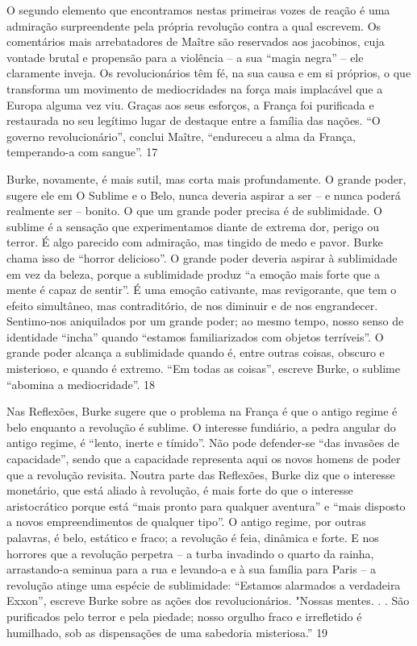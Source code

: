 \par
 
O segundo elemento que encontramos nestas primeiras vozes de reação é uma admiração surpreendente pela própria revolução contra a qual escrevem. Os comentários mais arrebatadores de Maître são reservados aos jacobinos, cuja vontade brutal e propensão para a violência – a sua “magia negra” – ele claramente inveja. Os revolucionários têm fé, na sua causa e em si próprios, o que transforma um movimento de mediocridades na força mais implacável que a Europa alguma vez viu. Graças aos seus esforços, a França foi purificada e restaurada no seu legítimo lugar de destaque entre a família das nações. “O governo revolucionário”, conclui Maître, “endureceu a alma da França, temperando-a com sangue”.
 {\color{blue} 17}  

 
\par
 
Burke, novamente, é mais sutil, mas corta mais profundamente. O grande poder, sugere ele em O Sublime e o Belo, nunca deveria aspirar a ser – e nunca poderá realmente ser – bonito. O que um grande poder precisa é de sublimidade. O sublime é a sensação que experimentamos diante de extrema dor, perigo ou terror. É algo parecido com admiração, mas tingido de medo e pavor. Burke chama isso de “horror delicioso”. O grande poder deveria aspirar à sublimidade em vez da beleza, porque a sublimidade produz “a emoção mais forte que a mente é capaz de sentir”. É uma emoção cativante, mas revigorante, que tem o efeito simultâneo, mas contraditório, de nos diminuir e de nos engrandecer. Sentimo-nos aniquilados por um grande poder; ao mesmo tempo, nosso senso de identidade “incha” quando “estamos familiarizados com objetos terríveis”. O grande poder alcança a sublimidade quando é, entre outras coisas, obscuro e misterioso, e quando é extremo. “Em todas as coisas”, escreve Burke, o sublime “abomina a mediocridade”.
 {\color{blue} 18}  

 
\par
 
Nas Reflexões, Burke sugere que o problema na França é que o antigo regime é belo enquanto a revolução é sublime. O interesse fundiário, a pedra angular do antigo regime, é “lento, inerte e tímido”. Não pode defender-se “das invasões de capacidade”, sendo que a capacidade representa aqui os novos homens de poder que a revolução revisita. Noutra parte das Reflexões, Burke diz que o interesse monetário, que está aliado à revolução, é mais forte do que o interesse aristocrático porque está “mais pronto para qualquer aventura” e “mais disposto a novos empreendimentos de qualquer tipo”. O antigo regime, por outras palavras, é belo, estático e fraco; a revolução é feia, dinâmica e forte. E nos horrores que a revolução perpetra – a turba invadindo o quarto da rainha, arrastando-a seminua para a rua e levando-a e à sua família para Paris – a revolução atinge uma espécie de sublimidade: “Estamos alarmados a verdadeira Exxon”, escreve Burke sobre as ações dos revolucionários. "Nossas mentes. . . São purificados pelo terror e pela piedade; nosso orgulho fraco e irrefletido é humilhado, sob as dispensações de uma sabedoria misteriosa.”
 {\color{blue} 19}  

